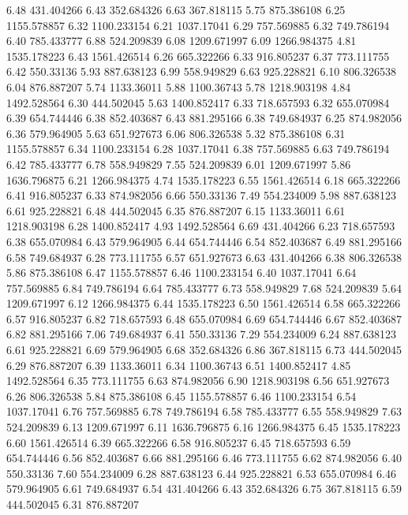 6.48 	431.404266
6.43 	352.684326
6.63 	367.818115
5.75 	875.386108
6.25 	1155.578857
6.32 	1100.233154
6.21 	1037.17041
6.29 	757.569885
6.32 	749.786194
6.40 	785.433777
6.88 	524.209839
6.08 	1209.671997
6.09 	1266.984375
4.81 	1535.178223
6.43 	1561.426514
6.26 	665.322266
6.33 	916.805237
6.37 	773.111755
6.42 	550.33136
5.93 	887.638123
6.99 	558.949829
6.63 	925.228821
6.10 	806.326538
6.04 	876.887207
5.74 	1133.36011
5.88 	1100.36743
5.78 	1218.903198
4.84 	1492.528564
6.30 	444.502045
5.63 	1400.852417
6.33 	718.657593
6.32 	655.070984
6.39 	654.744446
6.38 	852.403687
6.43 	881.295166
6.38 	749.684937
6.25 	874.982056
6.36 	579.964905
5.63 	651.927673
6.06 	806.326538
5.32 	875.386108
6.31 	1155.578857
6.34 	1100.233154
6.28 	1037.17041
6.38 	757.569885
6.63 	749.786194
6.42 	785.433777
6.78 	558.949829
7.55 	524.209839
6.01 	1209.671997
5.86 	1636.796875
6.21 	1266.984375
4.74 	1535.178223
6.55 	1561.426514
6.18 	665.322266
6.41 	916.805237
6.33 	874.982056
6.66 	550.33136
7.49 	554.234009
5.98 	887.638123
6.61 	925.228821
6.48 	444.502045
6.35 	876.887207
6.15 	1133.36011
6.61 	1218.903198
6.28 	1400.852417
4.93 	1492.528564
6.69 	431.404266
6.23 	718.657593
6.38 	655.070984
6.43 	579.964905
6.44 	654.744446
6.54 	852.403687
6.49 	881.295166
6.58 	749.684937
6.28 	773.111755
6.57 	651.927673
6.63 	431.404266
6.38 	806.326538
5.86 	875.386108
6.47 	1155.578857
6.46 	1100.233154
6.40 	1037.17041
6.64 	757.569885
6.84 	749.786194
6.64 	785.433777
6.73 	558.949829
7.68 	524.209839
5.64 	1209.671997
6.12 	1266.984375
6.44 	1535.178223
6.50 	1561.426514
6.58 	665.322266
6.57 	916.805237
6.82 	718.657593
6.48 	655.070984
6.69 	654.744446
6.67 	852.403687
6.82 	881.295166
7.06 	749.684937
6.41 	550.33136
7.29 	554.234009
6.24 	887.638123
6.61 	925.228821
6.69 	579.964905
6.68 	352.684326
6.86 	367.818115
6.73 	444.502045
6.29 	876.887207
6.39 	1133.36011
6.34 	1100.36743
6.51 	1400.852417
4.85 	1492.528564
6.35 	773.111755
6.63 	874.982056
6.90 	1218.903198
6.56 	651.927673
6.26 	806.326538
5.84 	875.386108
6.45 	1155.578857
6.46 	1100.233154
6.54 	1037.17041
6.76 	757.569885
6.78 	749.786194
6.58 	785.433777
6.55 	558.949829
7.63 	524.209839
6.13 	1209.671997
6.11 	1636.796875
6.16 	1266.984375
6.45 	1535.178223
6.60 	1561.426514
6.39 	665.322266
6.58 	916.805237
6.45 	718.657593
6.59 	654.744446
6.56 	852.403687
6.66 	881.295166
6.46 	773.111755
6.62 	874.982056
6.40 	550.33136
7.60 	554.234009
6.28 	887.638123
6.44 	925.228821
6.53 	655.070984
6.46 	579.964905
6.61 	749.684937
6.54 	431.404266
6.43 	352.684326
6.75 	367.818115
6.59 	444.502045
6.31 	876.887207

